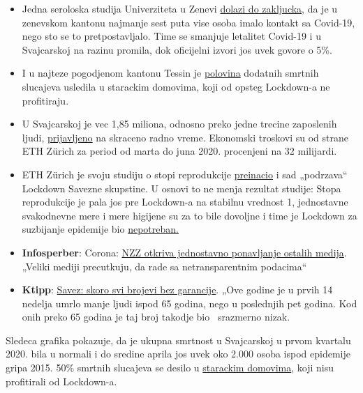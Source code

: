 \begin{itemize}
\tightlist
\item
  Jedna seroloska studija Univerziteta u Zenevi
  \href{https://www.hug-ge.ch/medias/communique-presse/seroprevalence-covid-19-premiere-estimation}{dolazi
  do zakljucka}, da je u zenevskom kantonu najmanje sest puta vise osoba
  imalo kontakt sa Covid-19, nego sto se to pretpostavljalo. Time se
  smanjuje letalitet Covid-19 i u Svajcarskoj na razinu promila, dok
  oficijelni izvori jos uvek govore o 5\%.
\item
  I u najteze pogodjenom kantonu Tessin je
  \href{https://www.bluewin.ch/de/news/schweiz/sp-chef-levrat-will-die-reichen-schropfen-383977.html}{polovina}
  dodatnih smrtnih slucajeva usledila u starackim domovima, koji od
  opsteg Lockdown-a ne profitiraju.
\item
  U Svajcarskoj je vec 1,85 miliona, odnosno preko jedne trecine
  zaposlenih ljudi,
  \href{https://www.bluewin.ch/de/news/schweiz/sp-chef-levrat-will-die-reichen-schropfen-383977.html}{prijavljeno}
  na skraceno radno vreme. Ekonomski troskovi su od strane ETH Zürich za
  period od marta do juna 2020. procenjeni na 32 milijardi.
\item
  ETH Zürich je svoju studiju o stopi reprodukcije
  \href{https://www.nau.ch/politik/regional/coronavirus-eth-forscherin-passt-studie-an-und-stutzt-lockdown-65695817}{preinacio}
  i sad „podrzava`` Lockdown Savezne skupstine. U osnovi to ne menja
  rezultat studije: Stopa reprodukcije je pala jos pre Lockdown-a na
  stabilnu vrednost 1, jednostavne svakodnevne mere i mere higijene su
  za to bile dovoljne i time je Lockdown za suzbijanje epidemije bio
  \href{https://infekt.ch/2020/04/sind-wir-tatsaechlich-im-blindflug/}{nepotreban.}
\item
  \textbf{Infosperber}: Corona:
  \href{https://www.infosperber.ch/Artikel/Medien/Corona-NZZ-deckt-das-Nachplappern-anderer-Medien-auf}{NZZ
  otkriva jednostavno ponavljanje ostalih medija}. „Veliki mediji
  precutkuju, da rade sa netransparentnim podacima``
\item
  \textbf{Ktipp}:
  \href{https://www.ktipp.ch/artikel/artikeldetail/bund-fast-alle-zahlen-ohne-gewaehr/}{Savez:
  skoro svi brojevi bez garancije}. „Ove godine je u prvih 14 nedelja
  umrlo manje ljudi ispod 65 godina, nego u poslednjih pet godina. Kod
  onih preko 65 godina je taj broj takodje bio ~srazmerno nizak.
\end{itemize}

Sledeca grafika pokazuje, da je ukupna smrtnost u Svajcarskoj u prvom
kvartalu 2020. bila u normali i do sredine aprila jos uvek oko 2.000
osoba ispod epidemije gripa 2015. 50\% smrtnih slucajeva se desilo u
\href{https://www.nzz.ch/zuerich/coronavirus-zuerich-aendert-nun-das-testregime-in-heimenauch-viele-aeltere-covid-19-infizierte-entwickeln-keine-symptome-zuerich-aendert-nun-das-testregime-in-heimen-ld.1552089}{starackim
domovima}, koji nisu profitirali od Lockdown-a.

